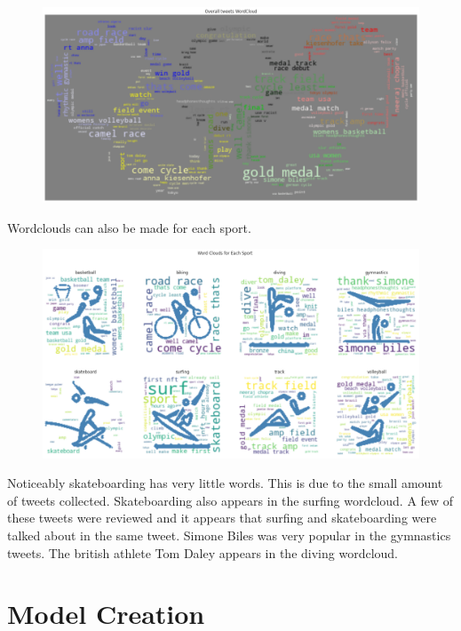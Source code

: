 \documentclass[12pt]{article}
\begin{document}
            \begin{figure}[H]
                \centering
                \includegraphics[scale=0.4]{wordcloud.png}
            \end{figure}

            Wordclouds can also be made for each sport.

            \begin{figure}[H]
                \centering
                \includegraphics[scale=0.4]{sportsclouds.png}
            \end{figure}

            Noticeably skateboarding has very little words. This is due to the small amount of tweets collected. Skateboarding also appears in the surfing wordcloud. 
            A few of these tweets were reviewed and it appears that surfing and skateboarding were talked about in the same tweet. Simone Biles was very popular in 
            the gymnastics tweets. The british athlete Tom Daley appears in the diving wordcloud.

    \section{Model Creation}
\end{document}
